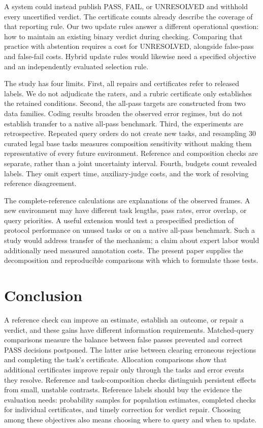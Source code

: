 \documentclass[10pt,letterpaper]{article}
\begin{document}
A system could instead publish PASS, FAIL, or UNRESOLVED and withhold every uncertified verdict. The certificate counts already describe the coverage of that reporting rule. Our two update rules answer a different operational question: how to maintain an existing binary verdict during checking. Comparing that practice with abstention requires a cost for UNRESOLVED, alongside false-pass and false-fail costs. Hybrid update rules would likewise need a specified objective and an independently evaluated selection rule.

The study has four limits. First, all repairs and certificates refer to released labels. We do not adjudicate the raters, and a rubric certificate only establishes the retained conditions. Second, the all-pass targets are constructed from two data families. Coding results broaden the observed error regimes, but do not establish transfer to a native all-pass benchmark. Third, the experiments are retrospective. Repeated query orders do not create new tasks, and resampling 30 curated legal base tasks measures composition sensitivity without making them representative of every future environment. Reference and composition checks are separate, rather than a joint uncertainty interval. Fourth, budgets count revealed labels. They omit expert time, auxiliary-judge costs, and the work of resolving reference disagreement.

The complete-reference calculations are explanations of the observed frames. A new environment may have different task lengths, pass rates, error overlap, or query priorities. A useful extension would test a prespecified prediction of protocol performance on unused tasks or on a native all-pass benchmark. Such a study would address transfer of the mechanism; a claim about expert labor would additionally need measured annotation costs. The present paper supplies the decomposition and reproducible comparisons with which to formulate those tests.

\section{Conclusion}
A reference check can improve an estimate, establish an outcome, or repair a verdict, and these gains have different information requirements. Matched-query comparisons measure the balance between false passes prevented and correct PASS decisions postponed. The latter arise between clearing erroneous rejections and completing the task's certificate. Allocation comparisons show that additional certificates improve repair only through the tasks and error events they resolve. Reference and task-composition checks distinguish persistent effects from small, unstable contrasts. Reference labels should buy the evidence the evaluation needs: probability samples for population estimates, completed checks for individual certificates, and timely correction for verdict repair. Choosing among these objectives also means choosing where to query and when to update.
\end{document}

